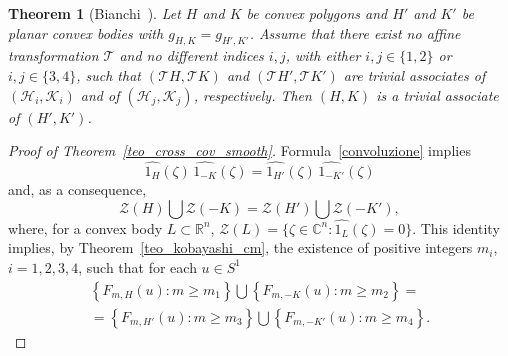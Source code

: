\documentclass[a4paper]{amsart}
\newtheorem{theorem}{Theorem}[section]
\theoremstyle{definition}
\numberwithin{equation}{section}
\begin{document}
\begin{theorem}[Bianchi~\cite{B4}]\label{teo_cov_congiunto_poligoni}
Let $H$ and $K$ be convex polygons and $H'$ and $K'$ be planar  convex bodies
with $g_{H,K}=g_{H',K'}$. Assume that there exist no affine transformation ${{\mathcal T}}$ and no different  indices $i,j$, with either $i,j\in\{1,2\}$ or  $i,j\in\{3,4\}$, such that $({{\mathcal T}} H,{{\mathcal T}} K)$ and $({{\mathcal T}} H',{{\mathcal T}} K')$ are trivial associates of $({{\mathcal H}}_i,{{\mathcal K}}_i)$ and of $({{\mathcal H}}_j,{{\mathcal K}}_j)$, respectively.
Then  $(H,K)$ is a trivial associate of $(H',K')$.
\end{theorem}

\begin{proof}[Proof of Theorem~\ref{teo_cross_cov_smooth}]
Formula~\eqref{convoluzione} implies
\[
 {\widehat{{{1_H}}}}(\zeta)\,{{\widehat{{{1_{-K}}}}}(\zeta)}={\widehat{{{1_{H'}}}}}(\zeta)\,{{\widehat{{{1_{-K'}}}}}(\zeta)}
\]
and, as a consequence,
\[
{{\mathcal Z}}(H)\bigcup{{{\mathcal Z}}(-K)}={{\mathcal Z}}(H')\bigcup{{{\mathcal Z}}(-K')}, 
\]
where, for a convex body $L\subset{\mathbb{R}}^n$, ${{\mathcal Z}}(L)=\{{{\zeta}}\in{\mathbb{C}}^n : {\widehat{{{1_L}}}}({{\zeta}})=0\}$.
This identity implies, by Theorem~\ref{teo_kobayashi_cm}, the existence of positive integers $m_i$, $i=1,2,3,4$,  such that
for each $u\in{S^{1}}$
\begin{multline}\label{union_of_zero_curves}
\left\{F_{m,H}(u):m\geq m_1\right\}\bigcup\left\{F_{m,-K}(u):m\geq m_2\right\}=\\
=\left\{F_{m,H'}(u):m\geq m_3\right\}\bigcup\left\{F_{m,-K'}(u):m\geq m_4\right\}.
\end{multline}


\end{proof}
\end{document}
